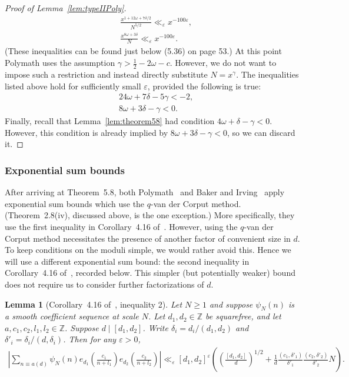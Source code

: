 \documentclass{amsart}
\newtheorem{lemma}{Lemma}
\numberwithin{equation}{section}
\begin{document}
\begin{proof}[Proof of Lemma~\ref{lem:typeIIPoly}]
\begin{align*}
&\frac{x^{1+12\omega+7\delta/2}}{N^{5/2}} \ll_\varepsilon x^{-100\varepsilon}, \\
&\frac{x^{8\omega + 3\delta}}{N}\ll_\varepsilon x^{-100\varepsilon}.
\end{align*}
(These inequalities can be found just below (5.36) on page 53.) At this point Polymath uses the assumption $\gamma > \frac{1}{2}-2\omega -c$. However, we do not want to impose such a restriction and instead directly substitute $N=x^\gamma$. The inequalities listed above hold for sufficiently small $\varepsilon$, provided the following is true:
\begin{align*}
&24\omega + 7\delta -5\gamma <-2, \\
&8\omega + 3\delta -\gamma <0.
\end{align*}
Finally, recall that Lemma~\ref{lem:theorem58} had condition $ 4\omega +\delta  -\gamma<0$. However, this condition is already implied by $8\omega + 3\delta -\gamma <0$, so we can discard it.
\end{proof}


\subsubsection{Exponential sum bounds}

After arriving at Theorem~5.8,   both Polymath~\cite{Polymath:2014:EDZ} and Baker and Irving~\cite{Baker:2017:BIP} apply exponential sum bounds which use the $q$-van der Corput method. (Theorem~2.8(iv), discussed above, is the one exception.) More specifically, they use the first inequality in Corollary~4.16 of~\cite{Polymath:2014:EDZ}.   However, using the $q$-van der Corput method necessitates the presence of another factor of convenient size in $d$. To keep conditions on the moduli simple, we would rather avoid this. Hence we will use a different exponential sum bound: the second inequality in Corollary~4.16 of~\cite{Polymath:2014:EDZ}, recorded below. This simpler (but potentially weaker) bound does not require us to consider further factorizations of $d$. 

\begin{lemma}[Corollary~4.16 of~\cite{Polymath:2014:EDZ}, inequality 2]\label{lem:cor416}
Let $N \geq 1$ and suppose $\psi_N(n)$ is a smooth coefficient sequence at scale $N$. Let $d_1, d_2 \in \mathbb{Z}$ be squarefree, and let $a, c_1, c_2, l_1, l_2 \in \mathbb{Z}$. Suppose $d \mid [d_1, d_2]$. Write $\delta_i = d_i/(d_1,d_2)$ and  $\delta'_i = \delta_i/(d,\delta_i)$. Then for any $\varepsilon>0$, 
\begin{align*}
\left|\sum_{n \equiv a (d)} \psi_N(n) e_{d_1}\!\left(\frac{c_1}{n+l_1} \right) e_{d_2}\!\left(\frac{c_2}{n+l_2} \right)\right| \ll_\varepsilon [d_1,d_2]^\varepsilon \left( \left(\frac{[d_1,d_2]}{d}\right)^{1/2} + \frac{1}{d} \frac{(c_1, \delta'_1)}{\delta'_1} \frac{(c_2, \delta'_2)}{\delta'_2} N \right).
\end{align*}
\end{lemma}
\end{document}

